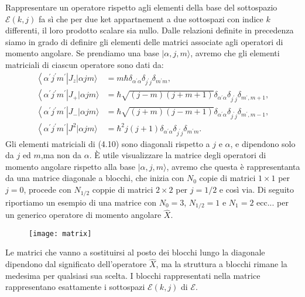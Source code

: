 Rappresentare un operatore rispetto agli elementi della base del sottospazio $\mathcal{E}(k,j)$ fa s\`i che per due ket appartnement a due sottospazi con indice $k$ differenti, il loro prodotto scalare sia nullo. Dalle relazioni definite in precedenza siamo in grado di definire gli elementi delle matrici associate agli operatori di momento angolare. Se prendiamo una base $|\alpha,j,m \rangle$, avremo che gli elementi matriciali di ciascun operatore sono dati da:
\begin{equation}
	\begin{aligned}
\left\langle\alpha^{\prime} j^{\prime} m^{\prime}\right| J_z|\alpha j m\rangle & =m \hbar \delta_{\alpha^{\prime} \alpha} \delta_{j^{\prime} j} \delta_{m^{\prime} m}, \\
\left\langle\alpha^{\prime} j^{\prime} m^{\prime}\right| J_{+}|\alpha j m\rangle & =\hbar \sqrt{(j-m)(j+m+1)} \delta_{\alpha^{\prime} \alpha} \delta_{j^{\prime} j} \delta_{m^{\prime}, m+1}, \\
\left\langle\alpha^{\prime} j^{\prime} m^{\prime}\right| J_{-}|\alpha j m\rangle & =\hbar \sqrt{(j+m)(j-m+1)} \delta_{\alpha^{\prime} \alpha} \delta_{j^{\prime} j} \delta_{m^{\prime}, m-1}, \\
\left\langle\alpha^{\prime} j^{\prime} m^{\prime}\right| J^2|\alpha j m\rangle & =\hbar^2 j(j+1) \delta_{\alpha^{\prime} \alpha} \delta_{j^{\prime} j} \delta_{m^{\prime} m} .
\end{aligned}
\end{equation}
Gli elementi matriciali di (4.10) sono diagonali rispetto a $j$ e $\alpha$, e dipendono solo da $j$ ed $m$,ma non da $\alpha$.
\`E utile visualizzare la matrice degli operatori di momento angolare rispetto alla base $|\alpha,j,m \rangle $, avremo che questa \`e rappresentanta da una matrice diagonale a blocchi, che inizia con $N_0$ copie di matrici $1 \times 1$ per $j=0$, procede con $N_{1/2}$ coppie di matrici $2 \times 2$ per $j = 1/2$ e cos\`i via. Di seguito riportiamo un esempio di una matrice con $N_0 = 3 $, $N_{1/2} = 1 $ e $N_1 = 2$ ecc... per un generico  operatore di momento angolare $\hat{X}$.
\newpage
 
\begin{figure}[!ht]
\vspace{0.4in}
\texttt{[image: matrix]}	
\centering
\vspace{0.1in}
\end{figure}
Le matrici che vanno a sostituirsi al posto dei blocchi lungo la diagonale dipendono dal significato dell'operatore $\hat{X}$, ma la struttura a blocchi rimane la medesima per qualsiasi sua scelta. I blocchi rappresentati nella matrice rappresentano esattamente i sottospazi $\mathcal{E}(k,j)$ di $\mathcal{E}$.

